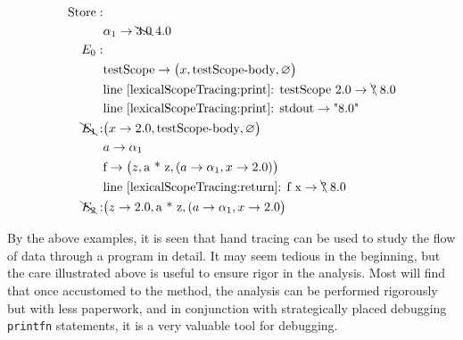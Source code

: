 \documentclass[fsharpnotes.tex]{subfiles}
\begin{document}
\begin{align*}
  \text{Store}: &\\
  & \alpha_1 \rightarrow \bcancel{3.0}\; 4.0\\
  E_0:&\\
      &\text{testScope} \rightarrow \big(x, \text{testScope-body}, \varnothing\big)\\
      & \text{line~\ref{lexicalScopeTracing:print}: testScope 2.0} \rightarrow \bcancel{\text{?}}\; 8.0\\
      & \text{line~\ref{lexicalScopeTracing:print}: stdout} \rightarrow \text{"8.0"}\\
  \bcancel{E_1}: & \big(x\rightarrow 2.0, \text{testScope-body}, \varnothing\big)\\
      & a \rightarrow \alpha_1\\
      & \text{f} \rightarrow \big(z, \text{a * z}, (a \rightarrow \alpha_1, x\rightarrow 2.0)\big)\\
      & \text{line~\ref{lexicalScopeTracing:return}: f x} \rightarrow \bcancel{\text{?}}\; 8.0\\
  \bcancel{E_2}: & \big(z \rightarrow 2.0, \text{a * z}, (a \rightarrow \alpha_1, x\rightarrow 2.0\big)\\
\end{align*}

By the above examples, it is seen that hand tracing can be used to study the flow of data through a program in detail. It may seem tedious in the beginning, but the care illustrated above is useful to ensure rigor in the analysis. Most will find that once accustomed to the method, the analysis can be performed rigorously but with less paperwork, and in conjunction with strategically placed debugging \lstinline!printfn! statements, it is a very valuable tool for debugging.
\end{document}
